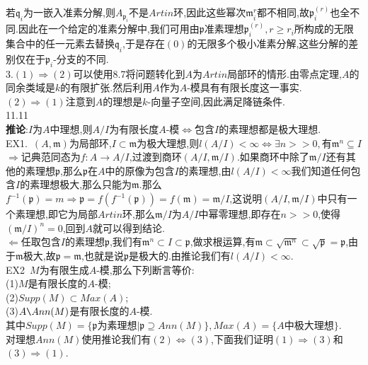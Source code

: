 \documentclass[b5paper]{ctexart}
\begin{document}
若$\mathfrak{q}_i$为一嵌入准素分解,则$A_{\mathfrak{p}_i}$不是$Artin$环,因此这些幂次$\mathfrak{m}_i^r$都不相同,故$\mathfrak{p}_i^{(r)}$也全不同.因此在一个给定的准素分解中,我们可用由$\mathfrak{p}$准素理想$\mathfrak{p}_i^{(r)},r\geq r_i$所构成的无限集合中的任一元素去替换$\mathfrak{q}_i$,于是存在$(0)$的无限多个极小准素分解,这些分解的差别仅在于$\mathfrak{p}_i$-分支的不同.\\
3.$(1)\Rightarrow (2)$可以使用8.7将问题转化到$A$为$Artin$局部环的情形.由零点定理,$A$的同余类域是$k$的有限扩张.然后利用$A$作为$A$-模具有有限长度这一事实.\\
$(2)\Rightarrow (1)$注意到$A$的理想是$k$-向量子空间,因此满足降链条件.\\
11.11\\
\textbf{推论}:$I$为$A$中理想,则$A/I$为有限长度$A$-模$\Leftrightarrow$包含$I$的素理想都是极大理想.\\
EX1.~$(A,\mathfrak{m})$为局部环,$I\subset \mathfrak{m}$为极大理想,则$l(A/I)<\infty \Leftrightarrow \exists n>>0,$有$\mathfrak{m}^n\subseteq I$\\
$\Rightarrow$记典范同态为$f:A\to A/I$,过渡到商环$(A/I,\mathfrak{m}/I)$.如果商环中除了$\mathfrak{m}/I$还有其他的素理想$\mathfrak{p}$,那么$\mathfrak{p}$在$A$中的原像为包含$I$的素理想,由$l(A/I)<\infty$我们知道任何包含$I$的素理想极大,那么只能为$\mathfrak{m}$.那么$f^{-1}(\mathfrak{p})=m\Rightarrow \mathfrak{p}=f(f^{-1}(\mathfrak{p}))=f(\mathfrak{m})=\mathfrak{m}/I$,这说明$(A/I,\mathfrak{m}/I)$中只有一个素理想,即它为局部$Artin$环,那么$\mathfrak{m}/I$为$A/I$中幂零理想,即存在$n>>0$,使得$(\mathfrak{m}/I)^n=0$,回到$A$就可以得到结论.\\
$\Leftarrow$任取包含$I$的素理想$\mathfrak{p}$,我们有$\mathfrak{m}^n\subset I\subset \mathfrak{p}$,做求根运算,有$\mathfrak{m}\subset\sqrt{\mathfrak{m}^n}\subset\sqrt{\mathfrak{p}}=\mathfrak{p}$,由于$\mathfrak{m}$极大,故$\mathfrak{p}=\mathfrak{m}$,也就是说$\mathfrak{p}$是极大的.由推论我们有$l(A/I)<\infty$.\\
EX2~$M$为有限生成$A$-模,那么下列断言等价:\\
(1)$M$是有限长度的$A$-模;\\
(2)$Supp(M)\subset Max(A)$;\\
(3)$A\texttt{\char92}Ann(M)$是有限长度的$A$-模.\\
其中$Supp(M)=\{\mathfrak{p}\text{为素理想}|\mathfrak{p}\supseteq Ann(M)\},Max(A)=\{A\text{中极大理想}\}$.\\
对理想$Ann(M)$使用推论我们有$(2)\Leftrightarrow(3)$,下面我们证明$(1)\Rightarrow (3)$和$(3)\Rightarrow (1)$.\\
\end{document}
